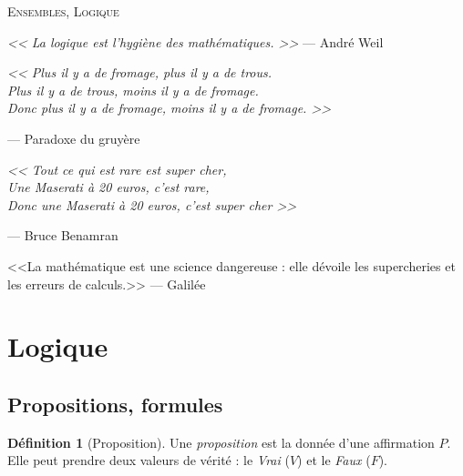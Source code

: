 \documentclass[11pt]{article}
\theoremstyle{definition}
\newtheorem{defn}{Définition}[section]
\theoremstyle{remark}
\begin{document}
\begin{center}
	\textsc{\LARGE Ensembles, Logique}
\end{center}
\vspace{1cm}

\begin{flushright}
\textit{<< La logique est l'hygiène des mathématiques. >>} — André Weil\end{flushright}

\begin{flushright}
\begin{flushleft}
\textit{<<
	Plus il y a de fromage, plus il y a de trous.\\
	Plus il y a de trous, moins il y a de fromage.\\
	Donc plus il y a de fromage, moins il y a de fromage.
	 >>}
\end{flushleft}
— Paradoxe du gruyère
\end{flushright}

\begin{flushright}
\begin{flushleft}
\textit{<< Tout ce qui est rare est super cher,\\
    Une Maserati à 20 euros, c'est rare,\\
    Donc une Maserati à 20 euros, c'est super cher >>}
\end{flushleft}
— Bruce Benamran
\end{flushright}

\begin{flushright}
<<La mathématique est une science dangereuse : elle dévoile les supercheries et les erreurs de calculs.>> — Galilée
\end{flushright}



\section{Logique}

\subsection{Propositions, formules}

\begin{defn}[Proposition]
Une \textit{proposition} est la donnée d'une affirmation $P$. Elle peut prendre deux valeurs de vérité : le \textit{Vrai} ($V$) et le \textit{Faux} ($F$).
\end{defn}
\end{document}

